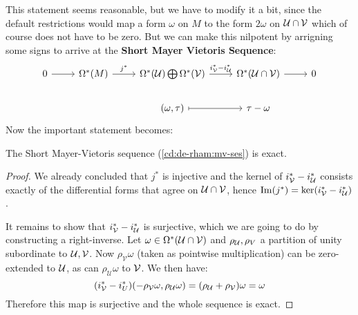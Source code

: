 This statement seems reasonable, but we have to modify it a bit, since the default restrictions would map a form $\omega$ on $M$
to the form $2\omega$ on $\mathcal{U} \cap \mathcal{V}$ which of course does not have to be zero. But we can make this nilpotent by arrigning some signs to arrive at the 
\textbf{Short Mayer Vietoris Sequence}:
\begin{equation}
	\begin{tikzcd}
	0 \arrow[r] & \Omega^*(M) \arrow[r, "j^*"] & \Omega^*(\U) \bigoplus \Omega^*(\V) \arrow[r, "i^*_\V - i^*_\U"] & \Omega^*(\U \cap \V) \arrow[r] & 0 \\
	            &                              & {(\omega, \tau)} \arrow[r, maps to]                              & \tau - \omega                  &  
	\end{tikzcd}
	\label{cd:de-rham:mv-ses}
\end{equation}
Now the important statement becomes:
\begin{theorem}
The Short Mayer-Vietoris sequence (\ref{cd:de-rham:mv-ses}) is exact.
\end{theorem}
\begin{proof}
We already concluded that $j^*$ is injective and the kernel of $i^*_{\mathcal{V}} - i^*_{\mathcal{U}}$ consists
exactly of the differential forms that agree on $\mathcal{U} \cap \mathcal{V}$, hence
$\operatorname{Im}(j^*) = \ker(i^*_{\mathcal{V}} - i^*_{\mathcal{U}})$.

It remains to show that $i^*_{\mathcal{V}} - i^*_{\mathcal{U}}$ is surjective, which we are going to do by
constructing a right-inverse. Let $\omega \in \Omega^*(\mathcal{U} \cap \mathcal{V})$ and $\rho_{\mathcal{U}}, \rho_V$ a
partition of unity subordinate to $\mathcal{U}, \mathcal{V}$. Now $\rho_\mathcal{V} \omega$ (taken as pointwise
multiplication) can be zero-extended to $\mathcal{U}$, as can $\rho_\mathcal{U} \omega$ to $\mathcal{V}$. We then
have:
\begin{equation*}
	(i^*_{\mathcal{V}} - i^*_U)(-\rho_{\mathcal{V}} \omega, \rho_{\mathcal{U}} \omega) = (\rho_{\mathcal{U}} + \rho_{\mathcal{V}})\omega = \omega
\end{equation*}
Therefore this map is surjective and the whole sequence is exact.
\end{proof}
